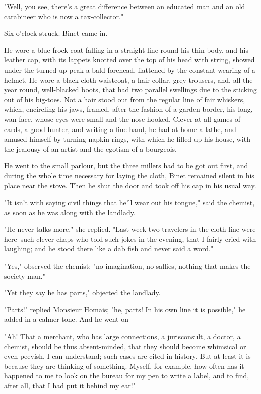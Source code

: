 \documentclass{tufte-book}
\begin{document}
"Well, you see, there's a great difference between an educated man and
an old carabineer who is now a tax-collector."

Six o'clock struck. Binet came in.

He wore a blue frock-coat falling in a straight line round his thin
body, and his leather cap, with its lappets knotted over the top of
his head with string, showed under the turned-up peak a bald forehead,
flattened by the constant wearing of a helmet. He wore a black cloth
waistcoat, a hair collar, grey trousers, and, all the year round,
well-blacked boots, that had two parallel swellings due to the sticking
out of his big-toes. Not a hair stood out from the regular line of fair
whiskers, which, encircling his jaws, framed, after the fashion of a
garden border, his long, wan face, whose eyes were small and the nose
hooked. Clever at all games of cards, a good hunter, and writing a
fine hand, he had at home a lathe, and amused himself by turning napkin
rings, with which he filled up his house, with the jealousy of an artist
and the egotism of a bourgeois.

He went to the small parlour, but the three millers had to be got out
first, and during the whole time necessary for laying the cloth, Binet
remained silent in his place near the stove. Then he shut the door and
took off his cap in his usual way.

"It isn't with saying civil things that he'll wear out his tongue," said
the chemist, as soon as he was along with the landlady.

"He never talks more," she replied. "Last week two travelers in the
cloth line were here--such clever chaps who told such jokes in the
evening, that I fairly cried with laughing; and he stood there like a
dab fish and never said a word."

"Yes," observed the chemist; "no imagination, no sallies, nothing that
makes the society-man."

"Yet they say he has parts," objected the landlady.

"Parts!" replied Monsieur Homais; "he, parts! In his own line it is
possible," he added in a calmer tone. And he went on--

"Ah! That a merchant, who has large connections, a jurisconsult, a
doctor, a chemist, should be thus absent-minded, that they should become
whimsical or even peevish, I can understand; such cases are cited in
history. But at least it is because they are thinking of something.
Myself, for example, how often has it happened to me to look on the
bureau for my pen to write a label, and to find, after all, that I had
put it behind my ear!"
\end{document}
